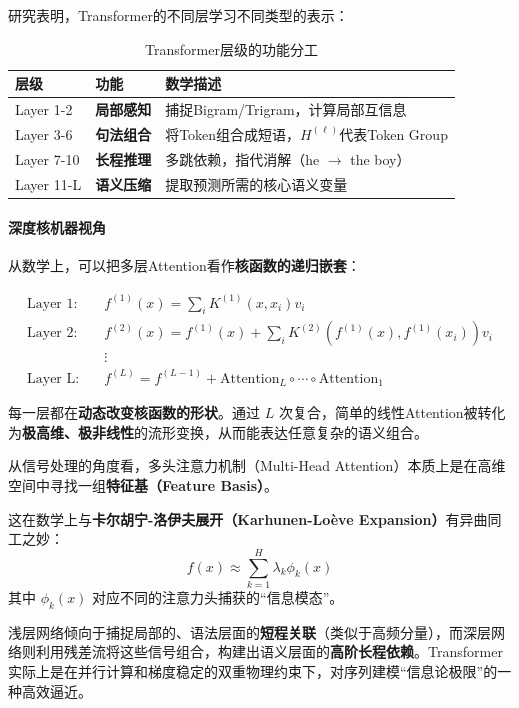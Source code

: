 研究表明，Transformer的不同层学习不同类型的表示：

\begin{table}[htbp]
\centering
\renewcommand{\arraystretch}{1.4}
\begin{tabularx}{\textwidth}{l|l|X}
\toprule
层级 & 功能 & 数学描述 \\
\midrule
Layer 1-2 & \textbf{局部感知} & 捕捉Bigram/Trigram，计算局部互信息 \\
\midrule
Layer 3-6 & \textbf{句法组合} & 将Token组合成短语，$H^{(\ell)}$代表Token Group \\
\midrule
Layer 7-10 & \textbf{长程推理} & 多跳依赖，指代消解（he $\to$ the boy） \\
\midrule
Layer 11-L & \textbf{语义压缩} & 提取预测所需的核心语义变量 \\
\bottomrule
\end{tabularx}
\caption{Transformer层级的功能分工}
\end{table}

\paragraph{深度核机器视角}

从数学上，可以把多层Attention看作\textbf{核函数的递归嵌套}：

\begin{align}
    \text{Layer 1:} \quad & f^{(1)}(x) = \sum_i K^{(1)}(x, x_i) v_i \\
    \text{Layer 2:} \quad & f^{(2)}(x) = f^{(1)}(x) + \sum_i K^{(2)}(f^{(1)}(x), f^{(1)}(x_i)) v_i \\
    & \vdots \\
    \text{Layer L:} \quad & f^{(L)} = f^{(L-1)} + \text{Attention}_L \circ \cdots \circ \text{Attention}_1
\end{align}

每一层都在\textbf{动态改变核函数的形状}。通过 $L$ 次复合，简单的线性Attention被转化为\textbf{极高维、极非线性}的流形变换，从而能表达任意复杂的语义组合。

\begin{remark}
    从信号处理的角度看，多头注意力机制（Multi-Head Attention）本质上是在高维空间中寻找一组\textbf{特征基（Feature Basis）}。
    
    这在数学上与\textbf{卡尔胡宁-洛伊夫展开（Karhunen-Loève Expansion）}有异曲同工之妙：
    \begin{equation}
        f(x) \approx \sum_{k=1}^{H} \lambda_{k} \phi_{k}(x)
    \end{equation}
    其中 $\phi_k(x)$ 对应不同的注意力头捕获的“信息模态”。
    
    浅层网络倾向于捕捉局部的、语法层面的\textbf{短程关联}（类似于高频分量），而深层网络则利用残差流将这些信号组合，构建出语义层面的\textbf{高阶长程依赖}。Transformer 实际上是在并行计算和梯度稳定的双重物理约束下，对序列建模“信息论极限”的一种高效逼近。
\end{remark}

